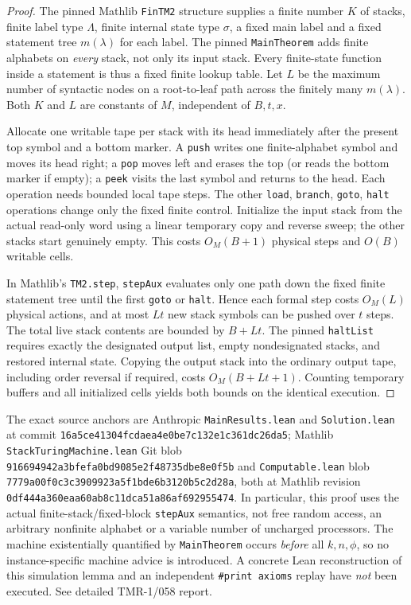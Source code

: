 \documentclass[11pt]{article}
\begin{document}
\begin{proof}
The pinned Mathlib \texttt{FinTM2} structure supplies a finite number
$K$ of stacks, finite label type $\Lambda$, finite internal state
type $\sigma$, a fixed main label and a fixed statement tree
$m(\lambda)$ for each label. The pinned \texttt{MainTheorem} adds
finite alphabets on \emph{every} stack, not only its input stack.
Every finite-state function inside a statement is thus a fixed
finite lookup table. Let $L$ be the maximum number of syntactic nodes
on a root-to-leaf path across the finitely many $m(\lambda)$.
Both $K$ and $L$ are constants of $M$, independent of $B,t,x$.

Allocate one writable tape per stack with its head immediately after
the present top symbol and a bottom marker. A \texttt{push} writes
one finite-alphabet symbol and moves its head right; a \texttt{pop}
moves left and erases the top (or reads the bottom marker if empty);
a \texttt{peek} visits the last symbol and returns to the head.
Each operation needs bounded local tape steps. The other
\texttt{load}, \texttt{branch}, \texttt{goto}, \texttt{halt}
operations change only the fixed finite control. Initialize the
input stack from the actual read-only word using a linear temporary
copy and reverse sweep; the other stacks start genuinely empty.
This costs $O_M(B+1)$ physical steps and $O(B)$ writable cells.

In Mathlib's \texttt{TM2.step}, \texttt{stepAux} evaluates only
one path down the fixed finite statement tree until the first
\texttt{goto} or \texttt{halt}. Hence each formal step costs
$O_M(L)$ physical actions, and at most $Lt$ new stack symbols
can be pushed over $t$ steps. The total live stack contents are
bounded by $B+Lt$. The pinned \texttt{haltList} requires exactly
the designated output list, empty nondesignated stacks, and restored
internal state. Copying the output stack into the ordinary output
tape, including order reversal if required, costs
$O_M(B+Lt+1)$. Counting temporary buffers and all initialized
cells yields both bounds on the identical execution.
\end{proof}

The exact source anchors are Anthropic \texttt{MainResults.lean}
and \texttt{Solution.lean} at commit
\texttt{16a5ce41304fcdaea4e0be7c132e1c361dc26da5};
Mathlib \texttt{StackTuringMachine.lean} Git blob
\texttt{916694942a3bfefa0bd9085e2f48735dbe8e0f5b} and
\texttt{Computable.lean} blob
\texttt{7779a00f0c3c3909923a5f1bde6b3120b5c2d28a},
both at Mathlib revision
\texttt{0df444a360eaa60ab8c11dca51a86af692955474}.
In particular, this proof uses the actual finite-stack/fixed-block
\texttt{stepAux} semantics, not free random access, an arbitrary
nonfinite alphabet or a variable number of uncharged processors.
The machine existentially quantified by \texttt{MainTheorem} occurs
\emph{before} all $k,n,\phi$, so no instance-specific machine advice
is introduced. A concrete Lean reconstruction of this simulation
lemma and an independent \texttt{\#print axioms} replay have
\emph{not} been executed. See detailed TMR-1/058 report.
\end{document}
